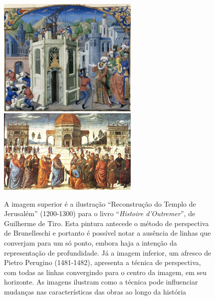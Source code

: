 \begin{figure}[h!]
  \begin{center}
    \includegraphics[width=0.6\textwidth]{figs/perspectiva1.png} \\
    \vspace{1cm}
    \includegraphics[width=0.6\textwidth]{figs/perspectiva2.png}
      \caption{A imagem superior é a ilustração ``Reconstrução do
        Templo de Jerusalém'' (1200-1300) para o livro
        ``\textit{Histoire d'Outremer}'', de Guilherme de Tiro. Esta
        pintura antecede o método de perspectiva de Brunelleschi e
        portanto é possível notar a ausência de linhas que converjam
        para um só ponto, embora haja a intenção da representação de
        profundidade. Já a imagem inferior, um afresco de Pietro
        Perugino (1481-1482), apresenta a técnica de perspectiva, com
        todas as linhas convergindo para o centro da imagem, em seu
        horizonte. As imagens ilustram como a técnica pode influenciar
        mudanças nas características das obras ao longo da história}
      \label{fig:perspectiva}
\end{center}
\end{figure}

